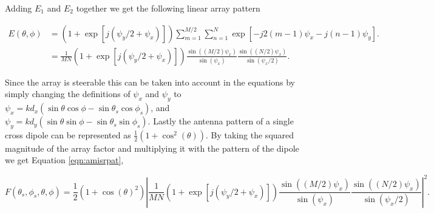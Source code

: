\noindent Adding $E_1$ and $E_2$ together we get the following linear array pattern

\begin{equation} \label{eq1}
\begin{split}
E(\theta,\phi) &= \displaystyle  \left(1+ \exp\left[j(\psi_y/2 + \psi_x)\right]\right)\sum_{m=1}^{M/2}\sum_{n=1}^{N}  \exp\left[-j2\left(m-1\right) \psi_x -j\left(n-1\right) \psi_y\right].\\
& = \frac{1}{MN} \left(1+ \exp\left[j(\psi_y/2 + \psi_x)\right]\right)\frac{\sin((M/2) \psi_x)}{\sin(\psi_x)} \frac{\sin((N/2) \psi_x)}{\sin(\psi_x/2)}.
\end{split}
\end{equation}

Since the array is steerable this can be taken into account in the equations by simply changing the definitions of $\psi_x $ and $\psi_y$ to $\psi_x = k d_x(\sin\theta\cos\phi-\sin\theta_s\cos\phi_s)$, and $\psi_y = k d_y(\sin\theta\sin\phi-\sin\theta_s\sin\phi_s)$. Lastly the antenna pattern of a single cross dipole can be represented as $ \frac{1}{2}(1+\cos^2(\theta))$\cite{Balanis:2005:ATA:1208379}. By taking the squared magnitude of the array factor and multiplying it with the pattern of the dipole we get Equation \ref{eqn:amisrpat},

\begin{equation}
\label{eqn:amisrpatfinal}
F(\theta_s,\phi_s,\theta,\phi) = \frac{1}{2}(1+\cos(\theta)^2)\left| \frac{1}{MN} \left(1+ \exp\left[j(\psi_y/2 + \psi_x)\right]\right)\frac{\sin((M/2) \psi_x)}{\sin(\psi_x)} \frac{\sin((N/2) \psi_x)}{\sin(\psi_x/2)}\right|^2.
\end{equation}